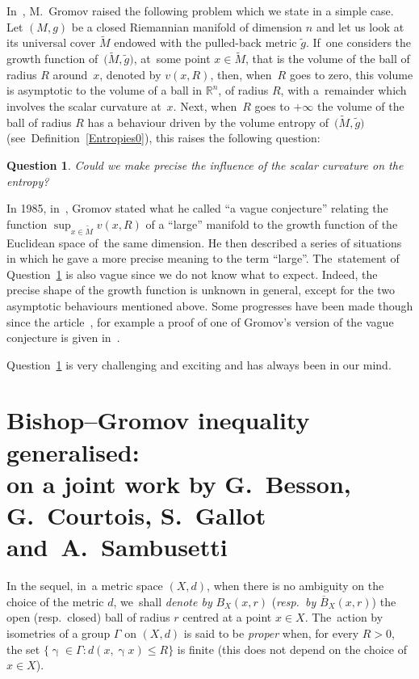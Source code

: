 \documentclass[10pt,a4paper]{amsart}
\numberwithin{equation}{section}
\newtheorem{question}[theor]{Question}
\newcommand{\g}{\operatorname{\gamma}}
\begin{document}
In~\cite{Gro-Large}, M.~Gromov raised the following problem which we state in a simple case. Let $(M,g)$ be a closed Riemannian manifold of dimension $n$ and let us look at its universal cover $\widetilde M$ endowed with the pulled-back metric $\tilde g$. If~one considers the growth function
of~$\big(\widetilde M, \tilde g\big)$, at~some point $x\in\widetilde M$, that is the volume of the ball of radius $R$ around~$x$, denoted by $v(x,R)$, then, when~$R$ goes to zero, this volume is asymptotic to the volume of a ball in $\mathbb{R}^n$, of radius $R$, with a~remainder which involves the scalar curvature at~$x$. Next, when~$R$ goes to $+\infty$ the volume of the ball of radius $R$ has a behaviour driven by the volume entropy of~$\big(\widetilde M, \tilde g\big)$ (see~Definition~\ref{Entropies0}), this raises the following
question:
\begin{question}\label{question:scal-ent}
Could we make precise the influence of the scalar curvature on the entropy?
\end{question}
In 1985, in~\cite[p.~108]{Gro-Large}, Gromov stated what he called ``a vague conjecture'' relating the function $\sup_{x\in\widetilde M}v(x,R)$ of a ``large'' manifold to the growth function of the Euclidean space of~the same dimension. He then described a series of situations in which he gave a more precise meaning to the term ``large''. The~statement of Question~\ref{question:scal-ent} is also vague since we do not
know what to expect. Indeed, the precise shape of the growth function is unknown in general, except for the two asymptotic behaviours mentioned above. Some progresses have been made though since the article~\cite{Gro-Large}, for example a proof of one of Gromov's version of the vague conjecture is given in~\cite{Guth-large}.

Question~\ref{question:scal-ent} is very challenging and exciting and has
always been in our mind.

\section[Bishop--Gromov inequality generalised: on a joint work by G.~Besson, G.~Courtois, S.~Gallot and~A.~Sambusetti]
{Bishop--Gromov inequality generalised:\\
on a joint work by G.~Besson, G.~Courtois, S.~Gallot \\and~A.~Sambusetti}\label{chap:BG}

In the sequel, in~a metric space $(X,d)$, when there is no ambiguity on the choice of the metric $d$, we~shall \textit{denote by} $B_X (x,r)$ (\textit{resp.\ by}
$\overline B_X (x,r)$) the open (resp.\ closed) ball of radius $r$ centred at a point $x \in X$. The~action by isometries of a group $\Gamma$ on $(X,d)$ is said
to be {\em proper} when, for every $R> 0$, the set $\{ \g \in \Gamma\colon d(
x, \g x) \le R\}$ is finite (this does not depend on the choice of~$x \in X$).
\end{document}

